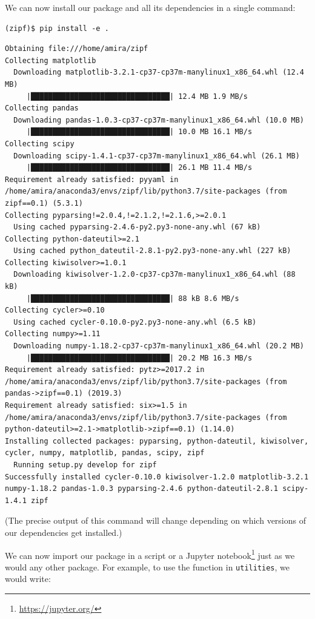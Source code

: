 \documentclass[
]{krantz}
\renewcommand{\href}[2]{#2\footnote{\url{#1}}}
\begin{document}
We can now install our package and all its dependencies in a single command:

\begin{verbatim}
(zipf)$ pip install -e .
\end{verbatim}

\begin{verbatim}
Obtaining file:///home/amira/zipf
Collecting matplotlib
  Downloading matplotlib-3.2.1-cp37-cp37m-manylinux1_x86_64.whl (12.4 MB)
     |████████████████████████████████| 12.4 MB 1.9 MB/s
Collecting pandas
  Downloading pandas-1.0.3-cp37-cp37m-manylinux1_x86_64.whl (10.0 MB)
     |████████████████████████████████| 10.0 MB 16.1 MB/s
Collecting scipy
  Downloading scipy-1.4.1-cp37-cp37m-manylinux1_x86_64.whl (26.1 MB)
     |████████████████████████████████| 26.1 MB 11.4 MB/s
Requirement already satisfied: pyyaml in /home/amira/anaconda3/envs/zipf/lib/python3.7/site-packages (from zipf==0.1) (5.3.1)
Collecting pyparsing!=2.0.4,!=2.1.2,!=2.1.6,>=2.0.1
  Using cached pyparsing-2.4.6-py2.py3-none-any.whl (67 kB)
Collecting python-dateutil>=2.1
  Using cached python_dateutil-2.8.1-py2.py3-none-any.whl (227 kB)
Collecting kiwisolver>=1.0.1
  Downloading kiwisolver-1.2.0-cp37-cp37m-manylinux1_x86_64.whl (88 kB)
     |████████████████████████████████| 88 kB 8.6 MB/s
Collecting cycler>=0.10
  Using cached cycler-0.10.0-py2.py3-none-any.whl (6.5 kB)
Collecting numpy>=1.11
  Downloading numpy-1.18.2-cp37-cp37m-manylinux1_x86_64.whl (20.2 MB)
     |████████████████████████████████| 20.2 MB 16.3 MB/s
Requirement already satisfied: pytz>=2017.2 in /home/amira/anaconda3/envs/zipf/lib/python3.7/site-packages (from pandas->zipf==0.1) (2019.3)
Requirement already satisfied: six>=1.5 in /home/amira/anaconda3/envs/zipf/lib/python3.7/site-packages (from python-dateutil>=2.1->matplotlib->zipf==0.1) (1.14.0)
Installing collected packages: pyparsing, python-dateutil, kiwisolver, cycler, numpy, matplotlib, pandas, scipy, zipf
  Running setup.py develop for zipf
Successfully installed cycler-0.10.0 kiwisolver-1.2.0 matplotlib-3.2.1 numpy-1.18.2 pandas-1.0.3 pyparsing-2.4.6 python-dateutil-2.8.1 scipy-1.4.1 zipf
\end{verbatim}

(The precise output of this command will change
depending on which versions of our dependencies get installed.)

We can now import our package in a script or a \href{https://jupyter.org/}{Jupyter notebook}
just as we would any other package.
For example,
to use the function in \texttt{utilities},
we would write:
\end{document}
